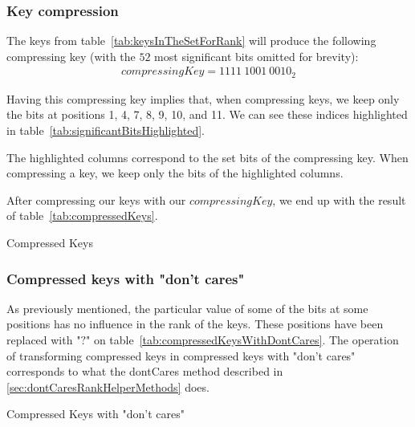 \subsubsection{Key compression} \label{sec:keyCompression}

The keys from table~\ref{tab:keysInTheSetForRank} will produce the following compressing key (with the $52$ most significant bits omitted for brevity):
\begin{align*}
    compressingKey = 1111\ 1001\ 0010_2
\end{align*}

Having this compressing key implies that, when compressing keys, we keep only the bits at positions 1, 4, 7, 8, 9, 10, and 11. We can see these indices highlighted in table~\ref{tab:significantBitsHighlighted}.

\begin{table}[H]
\centering

\caption[Example of bits that are kept when compressing keys]{The highlighted columns correspond to the set bits of the compressing key. When compressing a key, we keep only the bits of the highlighted columns.}
\label{tab:significantBitsHighlighted}
\end{table}

After compressing our keys with our $compressingKey$, we end up with the result of table~\ref{tab:compressedKeys}.

\begin{table}[H]
\centering

\caption[Example of compressed keys]{Compressed Keys}
\label{tab:compressedKeys}
\end{table}

\subsubsection{Compressed keys with "don't cares"} \label{sec:keyCompressionWithDontCares}

As previously mentioned, the particular value of some of the bits at some positions has no influence in the rank of the keys. These positions have been replaced with "$?$" on table~\ref{tab:compressedKeysWithDontCares}. The operation of transforming compressed keys in compressed keys with "don't cares" corresponds to what the {\ttfamily dontCares} method described in \ref{sec:dontCaresRankHelperMethods} does.

\begin{table}[H]
\centering

\caption[Example of compressed keys with "don't cares"]{Compressed Keys with "don't cares"}
\label{tab:compressedKeysWithDontCares}
\end{table}


